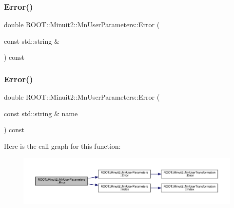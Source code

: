 \subsubsection{\texorpdfstring{Error()}{Error()}\hspace{0.1cm}{\footnotesize\ttfamily [3/4]}}
{\footnotesize\ttfamily double R\+O\+O\+T\+::\+Minuit2\+::\+Mn\+User\+Parameters\+::\+Error (\begin{DoxyParamCaption}\item[{const std\+::string \&}]{ }\end{DoxyParamCaption}) const}

\mbox{\label{classROOT_1_1Minuit2_1_1MnUserParameters_a52dd385b551b309d26d0dc30581c0b56}} 
\subsubsection{\texorpdfstring{Error()}{Error()}\hspace{0.1cm}{\footnotesize\ttfamily [4/4]}}
{\footnotesize\ttfamily double R\+O\+O\+T\+::\+Minuit2\+::\+Mn\+User\+Parameters\+::\+Error (\begin{DoxyParamCaption}\item[{const std\+::string \&}]{name }\end{DoxyParamCaption}) const}

Here is the call graph for this function\+:\nopagebreak
\begin{figure}[H]
\begin{center}
\leavevmode
\includegraphics[width=350pt]{d6/d10/classROOT_1_1Minuit2_1_1MnUserParameters_a52dd385b551b309d26d0dc30581c0b56_cgraph}
\end{center}
\end{figure}
\mbox{\label{classROOT_1_1Minuit2_1_1MnUserParameters_a7cae98f6146725427e852655cee7a857}} 
